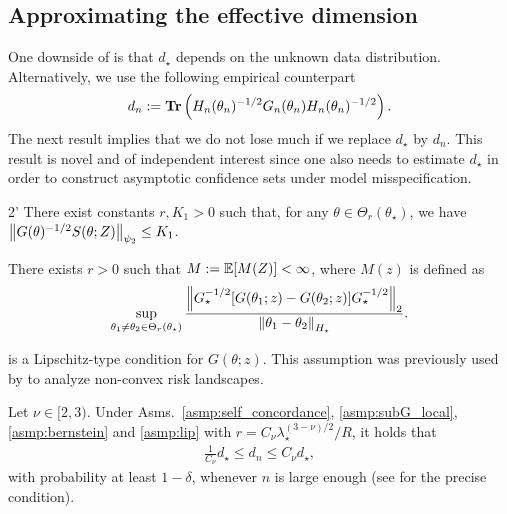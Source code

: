 \subsection{Approximating the effective dimension}

One downside of  is that $d_\star$ depends on the unknown data distribution.
Alternatively, we use the following empirical counterpart
\begin{align*}
    d_n := \operatorname{\bf Tr}\left(H_n(\theta_n)^{-1/2} G_n(\theta_n) H_n(\theta_n)^{-1/2} \right).
\end{align*}
The next result implies that we do not lose much if we replace $d_\star$ by $d_n$.
This result is novel and of independent interest since one also needs to estimate $d_\star$ in order to construct asymptotic confidence sets under model misspecification.

\begin{customasmp}{2'}\label{asmp:subG_local}
    There exist constants $r, K_1 > 0$ such that, for any $\theta \in \Theta_r(\theta_\star)$, we have $\left\lVert G(\theta)^{-1/2} S(\theta; Z) \right\rVert_{\psi_2} \le K_1$.
\end{customasmp}

\begin{assumption}\label{asmp:lip}
    There exists $r > 0$ such that $M := \operatorname{\mathbb E}[M(Z)] < \infty$, where $M(z)$ is defined as
    \begin{align*}
        \sup_{\theta_1 \neq \theta_2 \in \Theta_r(\theta_\star)} \frac{\left\lVert G_\star^{-1/2} [G(\theta_1; z) - G(\theta_2; z)] G_\star^{-1/2} \right\rVert_2}{\left\lVert \theta_1 - \theta_2 \right\rVert_{H_\star}}.
    \end{align*}
\end{assumption}

 is a Lipschitz-type condition for $G(\theta; z)$. This assumption was previously used by \citep[Assumption 3]{mei2018landscape} to analyze non-convex risk landscapes. 

\begin{proposition}\label{prop:d_n}
    Let $\nu \in [2, 3)$.
    Under Asms.~\ref{asmp:self_concordance}, \ref{asmp:subG_local}, \ref{asmp:bernstein} and \ref{asmp:lip} with $r = C_\nu \lambda_\star^{(3-\nu)/2}/R$, it holds that
    \begin{align*}
        \frac1{C_\nu} d_\star \le d_n \le C_\nu d_\star,
    \end{align*}
    with probability at least $1 - \delta$,
    whenever $n$ is large enough (see  for the precise condition).
\end{proposition}

